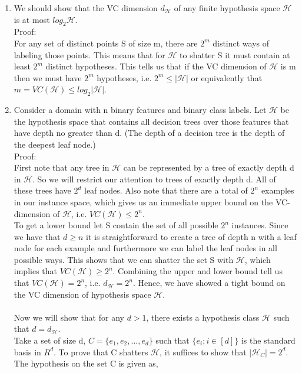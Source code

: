 \documentclass{article}
\begin{document}
\begin{enumerate}
    \item We should show that the VC dimension $d_\mathcal{H}$ of any finite hypothesis space $\mathcal{H}$ is at most $log_{2}\mathcal{H}$.
\\Proof:
\\For any set of distinct points S of size m, there are $2^m$ distinct ways of labeling those points. This means that for $\mathcal{H}$ to shatter S it must contain at least $2^m$ distinct hypotheses. This tells us that if the VC dimension of $\mathcal{H}$ is m then we must have $2^m$ hypotheses, i.e. $2^m \leq |\mathcal{H}| $ or equivalently that $m = VC(\mathcal{H}) \leq log_{2}|\mathcal{H}|$.
    \item Consider a domain with n binary features and binary class labels. Let $\mathcal{H}$ be the hypothesis space that contains all decision trees over those features that have depth no greater than d. (The depth of a decision tree is the depth of the deepest leaf node.)
\\Proof: 
\\First note that any tree in $\mathcal{H}$ can be represented by a tree of exactly depth d in $\mathcal{H}$. So we will restrict our attention to trees of exactly depth d. All of these trees have $2^d$ leaf nodes. Also note that there are a total of $2^n$ examples in our instance space, which gives us an immediate upper bound on the VC-dimension of $\mathcal{H}$, i.e. $VC(\mathcal{H}) \leq 2^n$.
\\To get a lower bound let S contain the set of all possible $2^n$
instances. Since we have that $d \geq n$ it is straightforward to create a tree of depth n with a leaf node for each example and furthermore we can label the leaf nodes in all possible ways. This shows that we can shatter the set S with $\mathcal{H}$, which implies that $VC(\mathcal{H}) \geq 2^n$. Combining the upper and lower bound tell us that $VC(\mathcal{H}) = 2^n$, i.e. $d_\mathcal{H} = 2^n$.
Hence, we have showed a tight bound on the VC dimension of hypothesis space $\mathcal{H}$.
\\\\Now we will show that for any $d > 1$, there exists a hypothesis class $\mathcal{H}$ such that $d = d_\mathcal{H}$.
\\Take a set of size d, $C = \{e_1, e_2, . . . , e_d\}$ such that $\{e_i;i \in [d]\}$ is the standard basis in $R^d$. To prove that C shatters $\mathcal{H}$, it suffices to show that $|\mathcal{H}_C| = 2^d$. The hypothesis on the set C is given as,

\end{enumerate}
\end{document}
